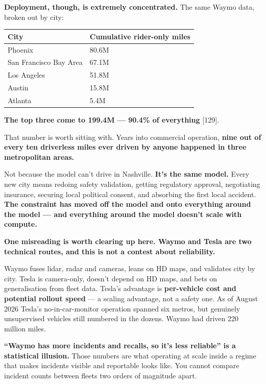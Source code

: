 \documentclass[11pt,a4paper]{article}
\begin{document}
\textbf{Deployment, though, is extremely concentrated.} The same Waymo data, broken out by city:

\begin{center}

\begin{tabularx}{\textwidth}{lX}
\toprule
City & Cumulative rider-only miles \\
\midrule
Phoenix & 80.6M \\
San Francisco Bay Area & 67.1M \\
Los Angeles & 51.8M \\
Austin & 15.8M \\
Atlanta & 5.4M \\
\bottomrule
\end{tabularx}
\end{center}

\textbf{The top three come to 199.4M --- 90.4\% of everything}{} [129].

That number is worth sitting with. Years into commercial operation, \textbf{nine out of every ten driverless miles ever driven by anyone happened in three metropolitan areas.}

Not because the model can't drive in Nashville. \textbf{It's the same model.} Every new city means redoing safety validation, getting regulatory approval, negotiating insurance, securing local political consent, and absorbing the first local accident. \textbf{The constraint has moved off the model and onto everything around the model --- and everything around the model doesn't scale with compute.}

\textbf{One misreading is worth clearing up here. Waymo and Tesla are two technical routes, and this is not a contest about reliability.}

Waymo fuses lidar, radar and cameras, leans on HD maps, and validates city by city. Tesla is camera-only, doesn't depend on HD maps, and bets on generalisation from fleet data. Tesla's advantage is \textbf{per-vehicle cost and potential rollout speed} --- a scaling advantage, not a safety one. As of August 2026 Tesla's no-in-car-monitor operation spanned six metros, but genuinely unsupervised vehicles still numbered in the dozens. Waymo had driven 220 million miles.

\textbf{``Waymo has more incidents and recalls, so it's less reliable'' is a statistical illusion.} Those numbers are what operating at scale inside a regime that makes incidents visible and reportable looks like. You cannot compare incident counts between fleets two orders of magnitude apart.
\end{document}
